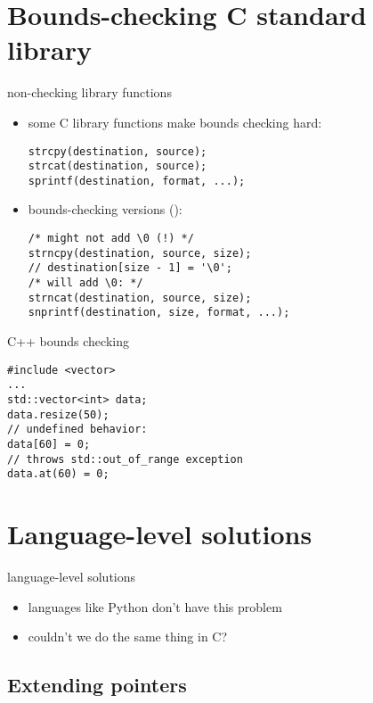 \section{Bounds-checking C standard library}

\begin{frame}[fragile,label=nonChecking]{non-checking library functions}
\lstset{language=C,style=small}
    \begin{itemize}
    \item some C library functions make bounds checking hard: 
\begin{lstlisting}
strcpy(destination, source);
strcat(destination, source);
sprintf(destination, format, ...);
\end{lstlisting}
    \item bounds-checking versions ():
\begin{lstlisting}
/* might not add \0 (!) */
strncpy(destination, source, size);
// destination[size - 1] = '\0';
/* will add \0: */
strncat(destination, source, size);
snprintf(destination, size, format, ...);
\end{lstlisting}
    \end{itemize}
\end{frame}

\begin{frame}[fragile,label=cppBounds]{C++ bounds checking}
\lstset{language=C,style=small}
\begin{lstlisting}
#include <vector>
...
std::vector<int> data;
data.resize(50);
// undefined behavior:
data[60] = 0;
// throws std::out_of_range exception
data.at(60) = 0;
\end{lstlisting}
\end{frame}

\section{Language-level solutions}

\begin{frame}{language-level solutions}
    \begin{itemize}
    \item languages like Python don't have this problem
    \item couldn't we do the same thing in C?
    \end{itemize}
\end{frame}

\subsection{Extending pointers}


